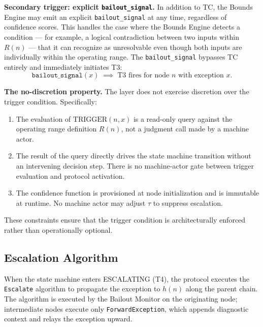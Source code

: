 \bigskip
\noindent\textbf{Secondary trigger: explicit \texttt{bailout\_signal}.} In addition to TC, the Bounds Engine may emit an explicit \texttt{bailout\_signal} at any time, regardless of confidence scores. This handles the case where the Bounds Engine detects a condition — for example, a logical contradiction between two inputs within $R(n)$ — that it can recognize as unresolvable even though both inputs are individually within the operating range. The \texttt{bailout\_signal} bypasses TC entirely and immediately initiates T3:
\begin{equation}
\texttt{bailout\_signal}(x) \;\implies\; \text{T3 fires for node } n \text{ with exception } x. \tag{TC-secondary}
\end{equation}

\bigskip
\noindent\textbf{The no-discretion property.} The \bounds{} layer does not exercise discretion over the trigger condition. Specifically:

\begin{enumerate}
    \item The evaluation of $\text{TRIGGER}(n, x)$ is a read-only query against the operating range definition $R(n)$, not a judgment call made by a machine actor.
    \item The result of the query directly drives the state machine transition without an intervening decision step. There is no machine-actor gate between trigger evaluation and protocol activation.
    \item The confidence function is provisioned at node initialization and is immutable at runtime. No machine actor may adjust $\tau$ to suppress escalation.
\end{enumerate}

These constraints ensure that the trigger condition is architecturally enforced rather than operationally optional.

\subsection{Escalation Algorithm}
\label{sec:escalation-algorithm}

When the state machine enters ESCALATING (T4), the protocol executes the \texttt{Escalate} algorithm to propagate the exception to $h(n)$ along the parent chain. The algorithm is executed by the Bailout Monitor on the originating node; intermediate nodes execute only \texttt{ForwardException}, which appends diagnostic context and relays the exception upward.

